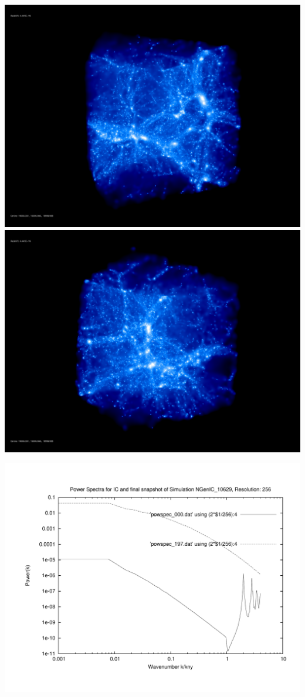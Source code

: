 \includegraphics[scale=0.1]{r256/h100/NGenIC_10629/rotate_00074.jpg} 
\includegraphics[scale=0.1]{r256/h100/NGenIC_10629/rotate_00131.jpg}

\includegraphics[scale=0.5]{r256/h100/NGenIC_10629/plot_powspec_NGenIC_10629}

